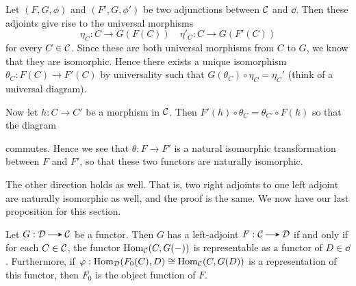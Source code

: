     \begin{prf}
        Let $(F, G, \phi)$ and $(F', G, \phi')$ be two adjunctions
        between  $\mathcal{C}$ and $\dd$. Then these adjoints give rise to the
        universal morphisms
        \[
            \eta_C : C \to G(F(C)) \quad \eta'_{C}: C \to G(F'(C))
        \]
        for every $C \in \mathcal{C}$. Since these are both universal
        morphisms from $C$ to $G$, we know that they are isomorphic.
        Hence there exists a unique isomorphism $\theta_C :  F(C) \to
        F'(C)$ by universality such that $G(\theta_C) \circ \eta_C =
        \eta_C'$ (think of a universal diagram). 

        Now let $h: C \to C'$ be a morphism in $\mathcal{C}$. Then 
        $F'(h) \circ \theta_C = \theta_{C'} \circ F(h)$ so that the diagram 
        \begin{center}
        \end{center}
        commutes. Hence we see that $\theta: F \to F'$ is a natural
        isomorphic transformation between $F$ and $F'$, so that these
        two functors are naturally isomorphic.
    \end{prf}
    The other direction holds as well. That is, two right adjoints to
    one left adjoint are naturally isomorphic as well, and the proof
    is the same. We now have our last proposition for this section. 

    \begin{proposition}
        Let $G: \dd \to \cc$ be a functor. Then $G$ has a left-adjoint
        $F: \cc \to \dd$ if and only if for each $C \in \mathcal{C}$, the
        functor $\operatorname{\mathrm{Hom}}_{\mathcal{C}}(C, G(-))$ is representable as a functor of
        $D \in \dd$. Furthermore, if $\varphi: \operatorname{\mathrm{Hom}}_{\mathcal{D}}(F_0(C), D)
        \cong \operatorname{\mathrm{Hom}}_{\mathcal{C}}(C, G(D))$ is a representation of this
        functor, then $F_0$ is the object function of $F$. 
    \end{proposition}


